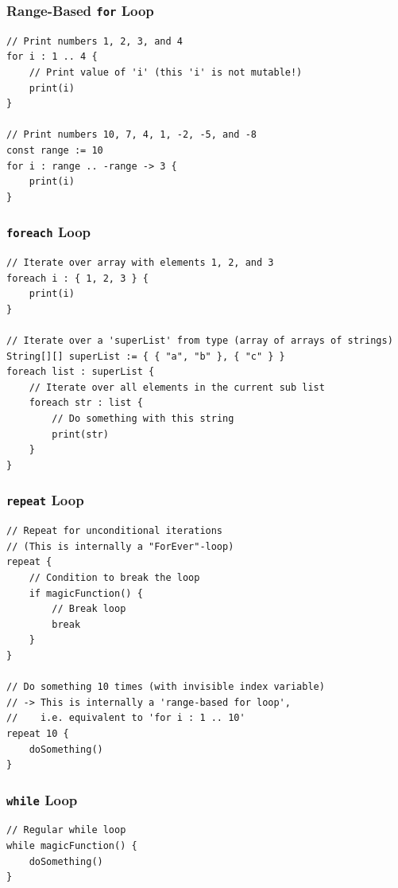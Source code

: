 \documentclass[a5paper]{report}
\begin{document}
\subsubsection{Range-Based \texttt{for} Loop}

\begin{lstlisting}
// Print numbers 1, 2, 3, and 4
for i : 1 .. 4 {
    // Print value of 'i' (this 'i' is not mutable!)
    print(i)
}

// Print numbers 10, 7, 4, 1, -2, -5, and -8
const range := 10
for i : range .. -range -> 3 {
    print(i)
}
\end{lstlisting}

\subsubsection{\texttt{foreach} Loop}

\begin{lstlisting}
// Iterate over array with elements 1, 2, and 3
foreach i : { 1, 2, 3 } {
    print(i)
}

// Iterate over a 'superList' from type (array of arrays of strings)
String[][] superList := { { "a", "b" }, { "c" } }
foreach list : superList {
    // Iterate over all elements in the current sub list
    foreach str : list {
        // Do something with this string
        print(str)
    }
}
\end{lstlisting}

\subsubsection{\texttt{repeat} Loop}

\begin{lstlisting}
// Repeat for unconditional iterations
// (This is internally a "ForEver"-loop)
repeat {
    // Condition to break the loop
    if magicFunction() {
        // Break loop
        break
    }
}

// Do something 10 times (with invisible index variable)
// -> This is internally a 'range-based for loop',
//    i.e. equivalent to 'for i : 1 .. 10'
repeat 10 {
    doSomething()
}
\end{lstlisting}

\subsubsection{\texttt{while} Loop}

\begin{lstlisting}
// Regular while loop
while magicFunction() {
    doSomething()
}
\end{lstlisting}
\end{document}
